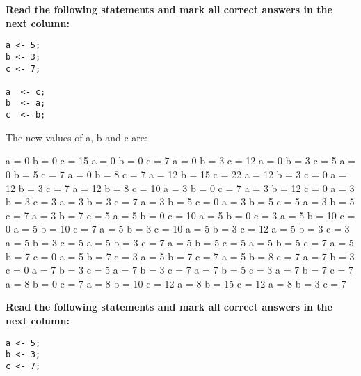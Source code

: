 \documentclass[10pt]{exam}
\begin{document}
\begin{questions}
\vspace{1cm}  \begin{minipage}[t][][t]{0.18\textwidth}
\question \bf Read the following statements and mark all correct answers in the next column: \raggedright
  \begin{lstlisting}
a <- 5;
b <- 3;
c <- 7;

a  <- c;
b  <- a;
c  <- b;
  \end{lstlisting}
\end{minipage}
  \hfill
\begin{minipage}[t][][t]{0.75\textwidth}
  The new values of a, b and c are:
  \begin{multicols*}{3}
\begin{checkboxes}
    \choice a = 0 b = 0 c = 15
    \choice a = 0 b = 0 c = 7
    \choice a = 0 b = 3 c = 12
    \choice a = 0 b = 3 c = 5
    \choice a = 0 b = 5 c = 7
    \choice a = 0 b = 8 c = 7
    \choice a = 12 b = 15 c = 22
    \choice a = 12 b = 3 c = 0
    \choice a = 12 b = 3 c = 7
    \choice a = 12 b = 8 c = 10
    \choice a = 3 b = 0 c = 7
    \choice a = 3 b = 12 c = 0
    \choice a = 3 b = 3 c = 3
    \choice a = 3 b = 3 c = 7
    \choice a = 3 b = 5 c = 0
    \choice a = 3 b = 5 c = 5
    \choice a = 3 b = 5 c = 7
    \choice a = 3 b = 7 c = 5
    \choice a = 5 b = 0 c = 10
    \choice a = 5 b = 0 c = 3
    \choice a = 5 b = 10 c = 0
    \choice a = 5 b = 10 c = 7
    \choice a = 5 b = 3 c = 10
    \choice a = 5 b = 3 c = 12
    \choice a = 5 b = 3 c = 3
    \choice a = 5 b = 3 c = 5
    \choice a = 5 b = 3 c = 7
    \choice a = 5 b = 5 c = 5
    \choice a = 5 b = 5 c = 7
    \choice a = 5 b = 7 c = 0
    \choice a = 5 b = 7 c = 3
    \choice a = 5 b = 7 c = 7
    \choice a = 5 b = 8 c = 7
    \choice a = 7 b = 3 c = 0
    \choice a = 7 b = 3 c = 5
    \choice a = 7 b = 3 c = 7
    \choice a = 7 b = 5 c = 3
    \choice a = 7 b = 7 c = 7
    \choice a = 8 b = 0 c = 7
    \choice a = 8 b = 10 c = 12
    \choice a = 8 b = 15 c = 12
    \choice a = 8 b = 3 c = 7
  \end{checkboxes}
\end{multicols*}
\end{minipage}

\vspace{1cm}  \begin{minipage}[t][][t]{0.18\textwidth}
\question \bf Read the following statements and mark all correct answers in the next column: \raggedright
  \begin{lstlisting}
a <- 5;
b <- 3;
c <- 7;


\end{lstlisting}
\end{minipage}
\end{questions}
\end{document}
